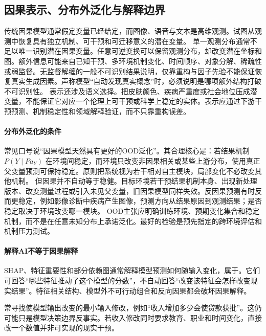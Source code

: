 \subsection{因果表示、分布外泛化与解释边界}

传统因果模型通常假定变量已经给定，而图像、语音与文本是高维观测。试图从观测中恢复具有独立机制、可干预和可迁移意义的潜在变量\parencite{scholkopf2021}。
单一观测分布通常不足以唯一识别潜在因果变量。任意可逆变换可以保留观测分布，却改变潜在坐标和图。额外信息可能来自已知干预、多环境机制变化、时间顺序、对象分解、稀疏性或弱监督。无监督解缠的一般不可识别结果说明，仅靠重构与因子先验不能保证恢复真实生成因素\parencite{locatello2019}。声称模型“自动发现真实概念”时，必须说明是哪项额外结构打破不可识别性。
表示还涉及语义选择。把皮肤颜色、疾病严重度或社会地位压成潜变量，不能保证它对应一个伦理上可干预或科学上稳定的实体。表示应通过下游干预预测、机制稳定性和领域解释验证，而不只靠重构误差。

\paragraph{分布外泛化的条件}

常见口号说“因果模型天然具有更好的OOD泛化”。其合理核心是：若结果机制 $P(Y\mid Pa_Y)$ 在环境间稳定，而环境只改变非因果相关或某些上游分布，使用真正父变量预测可保持稳定。原则把系统视为若干相对自主模块，局部变化不必改变其他机制\parencite{peters2017}。
但因果并不自动等于稳健。目标环境若干预结果机制本身、出现新处理版本、改变测量过程或引入未见父变量，旧因果模型同样失效。反因果预测有时反而更稳定，例如影像诊断中疾病产生图像，预测方向从结果原因到观测结果；是否稳定取决于环境改变哪一模块。
OOD主张应明确训练环境、预期变化集合和稳定机制，而不是在任意未知分布上承诺泛化。最好的检验是预先指定的跨环境评估和机制压力测试。

\paragraph{解释AI不等于因果解释}

SHAP、特征重要性和部分依赖图通常解释模型预测如何随输入变化，属于。它们可回答“哪些特征推动了这个模型的分数”，不自动回答“改变该特征会怎样改变现实结果”。特征相关结构、模型外不可行动组合和反向因果都会破坏因果解释。

常寻找使模型输出改变的最小输入修改，例如“收入增加多少会使贷款获批”。这仍可能只是模型决策边界反事实。若收入修改同时要求教育、职业和时间变化，直接改一个数值并非可实现的现实干预。

